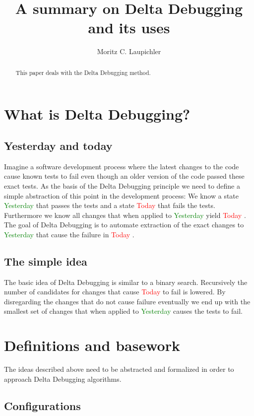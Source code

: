 \documentclass[a4paper,UKenglish]{lipics-v2018}
\title{A summary on Delta Debugging and its uses}
\author{Moritz C. Laupichler}{Fakultät für Informatik, Karlsruhe Institute of Technology, Germany}{moritz.laupichler@student.kit.edu}{}{}
\newcommand{\green}[1]{\textcolor{green}{#1}}
\newcommand{\red}[1]{\textcolor{red}{#1}}
\newcommand{\yd}[0]{\green{Yesterday} }
\newcommand{\td}[0]{\red{Today} }
\begin{document}
\maketitle

\begin{abstract}
	This paper deals with the Delta Debugging method.
\end{abstract}
	
\section{What is Delta Debugging?}

\subsection{Yesterday and today}
\label{ydandtd}

Imagine a software development process where the latest changes to the code cause known tests to fail even though an older version of the code passed these exact tests. As the basis of the Delta Debugging principle we need to define a simple abstraction of this point in the development process: We know a state \yd that passes the tests and a state \td that fails the tests. Furthermore we know all changes that when applied to \yd yield \td. \\
The goal of Delta Debugging is to automate extraction of the exact changes to \yd that cause the failure in \td.  

\subsection{The simple idea}
\label{ddidea}

The basic idea of Delta Debugging is similar to a binary search. Recursively the number of candidates for changes that cause \td to fail is lowered. By disregarding the changes that do not cause failure eventually we end up with the smallest set of changes that when applied to \yd causes the tests to fail. 



\section{Definitions and basework}

The ideas described above need to be abstracted and formalized in order to approach Delta Debugging algorithms.

\subsection{Configurations}
\end{document}
